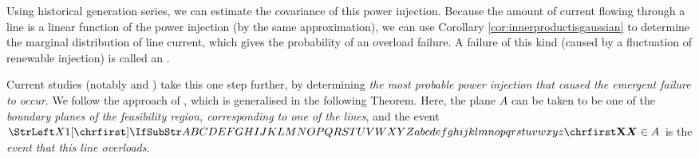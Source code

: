 \documentclass[main.tex]{subfiles}
\begin{document}
Using historical generation series, we can estimate the covariance of this power injection. Because the amount of current flowing through a line is a linear function of the power injection (by the same approximation), we can use Corollary \ref{cor:innerproductisgaussian} to determine the marginal distribution of line current, which gives the probability of an overload failure. A failure of this kind (\ie caused by a fluctuation of renewable injection) is called an .

Current studies (notably \cite{Nesti2018emergentfailures} and \cite{Chertkov2011}) take this one step further, by determining \emph{the most probable power injection that caused the emergent failure to occur}. We follow the approach of \cite{Nesti2018emergentfailures}, which is generalised in the following Theorem. Here, the plane $A$ can be taken to be one of the \emph{boundary planes of the feasibility region, corresponding to one of the lines}, and the event $\mat{X} \in A$ is the \emph{event that this line overloads}.
\end{document}
